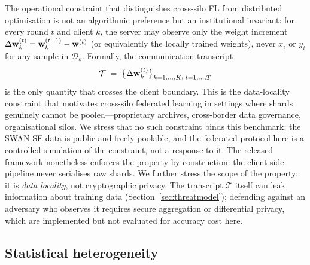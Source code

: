 The operational constraint that distinguishes cross-silo FL from
distributed optimisation is not an algorithmic preference but an
institutional invariant: for every round $t$ and client $k$, the
server may observe only the weight increment
$\Delta \mathbf{w}_k^{(t)} = \mathbf{w}_k^{(t+1)} - \mathbf{w}^{(t)}$ (or equivalently the
locally trained weights), never $x_i$ or $y_i$ for any sample in
$\mathcal{D}_k$. Formally, the communication transcript
\begin{equation}\label{eq:privacy}
    \mathcal{T} \;=\;
    \big\{\Delta \mathbf{w}_k^{(t)}\big\}_{k=1,\dots,K;\; t=1,\dots,T}
\end{equation}
is the only quantity that crosses the client boundary. This is the
data-locality constraint that motivates cross-silo federated learning
in settings where shards genuinely cannot be pooled---proprietary
archives, cross-border data governance, organisational silos. We
stress that no such constraint binds this benchmark: the SWAN-SF
data is public and freely poolable, and the federated protocol here
is a controlled simulation of the constraint, not a response to it.
The released framework nonetheless enforces the property by
construction: the client-side pipeline never serialises raw shards.
We further stress the scope of the property: it is
\emph{data locality}, not cryptographic privacy. The transcript
$\mathcal{T}$ itself can leak information about training data
(Section~\ref{sec:threatmodel}); defending against an adversary who
observes it requires secure aggregation or differential privacy, which
are implemented but not evaluated for accuracy cost here.

\subsection{Statistical heterogeneity}

